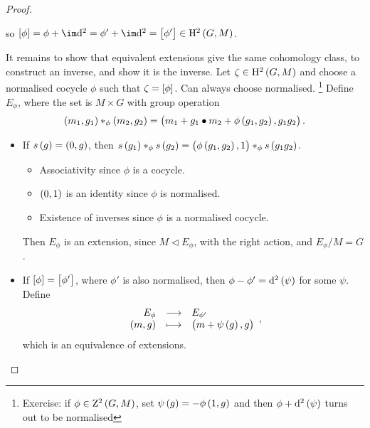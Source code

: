 \begin{proof}
\begin{itemize}
so $ \sbr{\phi} = \phi + \im \d^2 = \phi' + \im \d^2 = \sbr{\phi'} \in \H^2\br{G, M} $.
\end{itemize}
It remains to show that equivalent extensions give the same cohomology class, to construct an inverse, and show it is the inverse. Let $ \zeta \in \H^2\br{G, M} $ and choose a normalised cocycle $ \phi $ such that $ \zeta = \sbr{\phi} $. Can always choose normalised. \footnote{Exercise: if $ \phi \in \Z^2\br{G, M} $, set $ \psi\br{g} = -\phi\br{1, g} $ and then $ \phi + \d^2\br{\psi} $ turns out to be normalised} Define $ E_\phi $, where the set is $ M \times G $ with group operation
$$ \br{m_1, g_1} *_\phi \br{m_2, g_2} = \br{m_1 + g_1 \bullet m_2 + \phi\br{g_1, g_2}, g_1g_2}. $$
\begin{itemize}
\item If $ s\br{g} = \br{0, g} $, then $ s\br{g_1} *_\phi s\br{g_2} = \br{\phi\br{g_1, g_2}, 1} *_\phi s\br{g_1g_2} $.
\begin{itemize}
\item Associativity since $ \phi $ is a cocycle.
\item $ \br{0, 1} $ is an identity since $ \phi $ is normalised.
\item Existence of inverses since $ \phi $ is a normalised cocycle.
\end{itemize}
Then $ E_\phi $ is an extension, since $ M \triangleleft E_\phi $, with the right action, and $ E_\phi / M = G $.

\pagebreak

\item If $ \sbr{\phi} = \sbr{\phi'} $, where $ \phi' $ is also normalised, then $ \phi - \phi' = \d^2\br{\psi} $ for some $ \psi $. Define
$$ \function{E_\phi}{E_{\phi'}}{\br{m, g}}{\br{m + \psi\br{g}, g}}, $$
which is an equivalence of extensions.
\end{itemize}
\end{proof}

